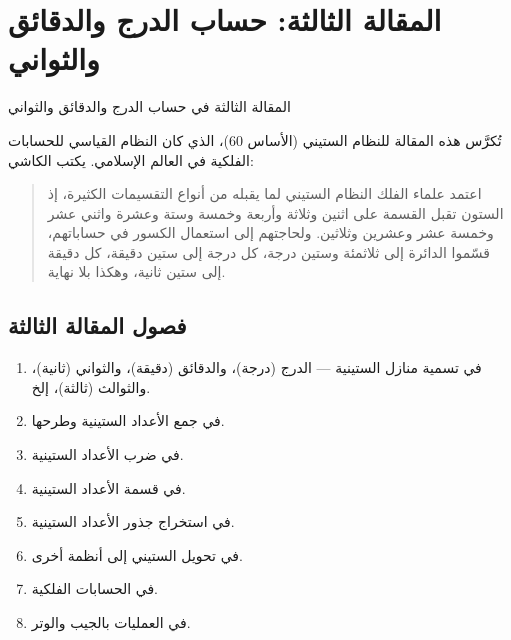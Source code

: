 \documentclass[11pt,a4paper]{book}
\newcommand{\ar}[1]{\arabicfont\beginR #1\endR}
\newcommand{\arHuge}[1]{{\Huge\arabicfont\beginR #1\endR}}
\newenvironment{arabicbox}{%
  \begin{framed}
  \begin{minipage}{\linewidth-2\fboxsep-2\fboxrule}
  \setlength{\parindent}{0pt}
  \linespread{1.3}\selectfont
}{%
  \end{minipage}
  \end{framed}
}
\begin{document}
\chapter{\ar{المقالة الثالثة: حساب الدرج والدقائق والثواني}}
\label{ch:treatise3}

\begin{arabicbox}
\begin{center}
\arHuge{المقالة الثالثة في حساب الدرج والدقائق والثواني}
\end{center}
\end{arabicbox}

\vspace{0.5cm}

\noindent\ar{تُكرَّس هذه المقالة للنظام الستيني (الأساس 60)، الذي كان النظام القياسي للحسابات الفلكية في العالم الإسلامي. يكتب الكاشي:}

\begin{quote}
\ar{اعتمد علماء الفلك النظام الستيني لما يقبله من أنواع التقسيمات الكثيرة، إذ الستون تقبل القسمة على اثنين وثلاثة وأربعة وخمسة وستة وعشرة واثني عشر وخمسة عشر وعشرين وثلاثين. ولحاجتهم إلى استعمال الكسور في حساباتهم، قسّموا الدائرة إلى ثلاثمئة وستين درجة، كل درجة إلى ستين دقيقة، كل دقيقة إلى ستين ثانية، وهكذا بلا نهاية.}
\end{quote}

\section{\ar{فصول المقالة الثالثة}}

\begin{enumerate}[label=\textbf{\ar{فصل} \arabic*:}]
  \item \ar{في تسمية منازل الستينية — الدرج (\ar{درجة})، والدقائق (\ar{دقيقة})، والثواني (\ar{ثانية})، والثوالث (\ar{ثالثة})، إلخ.}
  \item \ar{في جمع الأعداد الستينية وطرحها.}
  \item \ar{في ضرب الأعداد الستينية.}
  \item \ar{في قسمة الأعداد الستينية.}
  \item \ar{في استخراج جذور الأعداد الستينية.}
  \item \ar{في تحويل الستيني إلى أنظمة أخرى.}
  \item \ar{في الحسابات الفلكية.}
  \item \ar{في العمليات بالجيب والوتر.}
\end{enumerate}
\end{document}
